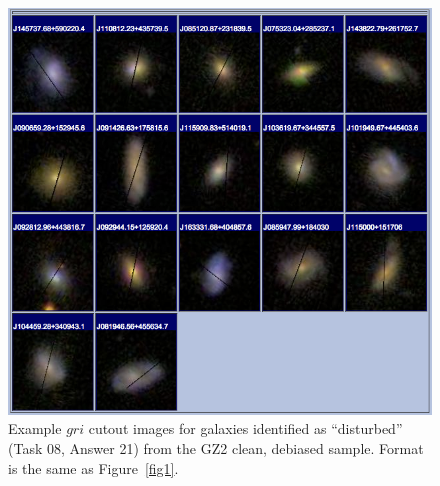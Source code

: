 \documentclass[useAMS,usenatbib]{mn2e}
\begin{document}
\newpage
\clearpage
\begin{figure}
\includegraphics[angle=0,width=7.0in]{figures/gallery/disturbed.png}
\caption{Example $gri$ cutout images for galaxies identified as ``disturbed'' (Task 08, Answer 21) from the GZ2 clean, debiased sample. Format is the same as Figure~\ref{fig1}.}
\end{figure}
\end{document}
